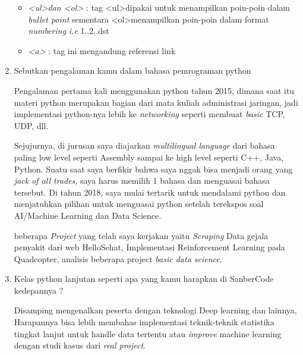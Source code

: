\documentclass{report}
\begin{document}
\begin{enumerate}
\begin{itemize}
              \item \emph{\textless ul\textgreater dan \textless ol\textgreater } :
            tag \textless ul\textgreater dipakai untuk menampilkan poin-poin dalam \emph{bullet point} sementara \textless ol\textgreater menampilkan poin-poin dalam format \emph{numbering} \emph{i.e} 1..2..dst
            
            \item \emph{\textless a\textgreater} :
            tag ini mengandung referensi link
    \end{itemize}
    
    \item Sebutkan pengalaman kamu dalam bahasa pemrograman python
    
        Pengalaman pertama kali menggunakan python tahun 2015, dimana saat itu materi python merupakan bagian dari mata kuliah administrasi jaringan, jadi implementasi python-nya lebih ke \emph{networking} seperti membuat \emph{basic} TCP, UDP, dll.
        
        Sejujurnya, di jurusan saya diajarkan \emph{multilingual language} dari bahasa paling low level seperti Assembly sampai ke high level seperti C++, Java, Python. Suatu saat saya berfikir bahwa saya nggak bisa menjadi orang yang \emph{jack of all trades}, saya harus memilih 1 bahasa dan menguasai bahasa tersebut. Di tahun 2018, saya mulai tertarik untuk mendalami python dan menjatuhkan pilihan untuk menguasai python setelah terekspos soal AI/Machine Learning dan Data Science. 
        
        beberapa \emph{Project} yang telah saya kerjakan yaitu \emph{Scraping} Data gejala penyakit dari web HelloSehat, Implementasi Reinforcement Learning pada Quadcopter, analisis beberapa project \emph{basic data science}.
    
    \item Kelas python lanjutan seperti apa yang kamu harapkan di SanberCode kedepannya ?
    
        Disamping mengenalkan peserta dengan teknologi Deep learning dan lainnya, Harapannya bisa lebih membahas implementasi teknik-teknik statistika tingkat lanjut untuk handle data tertentu atau \emph{improve} machine learning dengan studi kasus dari \emph{real project}. 
\end{enumerate}
\end{document}
